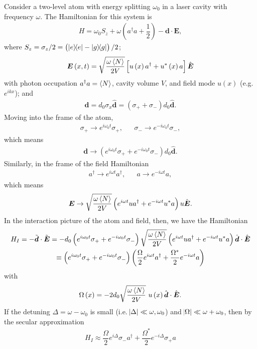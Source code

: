 \documentclass[aps,notitlepage,nofootinbib,10pt]{revtex4-1}
\newcommand{\f}[2]{\dfrac{#1}{#2}} %
\newcommand{\p}[1]{\left(#1\right)} %
\renewcommand{\sp}[1]{\left[#1\right]} %
\renewcommand{\v}{\bm} %
\newcommand{\uv}[1]{\hat{\v{#1}}} %
\renewcommand{\c}{\cdot} %
\newcommand{\bk}{\Braket} %
\newcommand{\1}{\mathds{1}}
\begin{document}
Consider a two-level atom with energy splitting $\omega_0$ in a laser
cavity with frequency $\omega$. The Hamiltonian for this system is
\begin{align}
  H = \omega_0S_z + \omega\p{a^\dag a+\f12} - \v d\c\v E,
\end{align}
where $S_z=\sigma_z/2=\p{\op e - \op g}/2$;
\begin{align}
  \v E\p{x,t}
  = \sqrt{\f{\omega\bk N}{2V}} \sp{u\p{x}a^\dag+u^*\p{x}a} \uv E
\end{align}
with photon occupation $a^\dag a=\bk N$, cavity volume $V$, and field
mode $u\p{x}$ (e.g. $e^{ikx}$); and
\begin{align}
  \v d = d_0\sigma_x\uv d = \p{\sigma_++\sigma_-}d_0\uv d.
\end{align}
Moving into the frame of the atom,
\begin{align}
  \sigma_+ \to e^{i\omega_0t}\sigma_+,
  && \sigma_- \to e^{-i\omega_0t}\sigma_-,
\end{align}
which means
\begin{align}
  \v d \to \p{e^{i\omega_0t}\sigma_++e^{-i\omega_0t}\sigma_-}d_0\uv d.
\end{align}
Similarly, in the frame of the field Hamiltonian
\begin{align}
  a^\dag \to e^{i\omega t}a^\dag, && a \to e^{-i\omega t} a,
\end{align}
which means
\begin{align}
  \v E \to \sqrt{\f{\omega\bk N}{2V}}
  \p{e^{i\omega t} u a^\dag + e^{-i\omega t} u^* a}u\uv E.
\end{align}
In the interaction picture of the atom and field, then, we have the
Hamiltonian
\begin{multline}
  H_I
  = -\tilde{\v d}\c\tilde{\v E}
  = -d_0\p{e^{i\omega_0t}\sigma_++e^{-i\omega_0t}\sigma_-}
  \sqrt{\f{\omega\bk N}{2V}}
  \p{e^{i\omega t} u a^\dag + e^{-i\omega t} u^* a}\uv d\c\uv E \\
  \equiv
  \p{e^{i\omega_0t}\sigma_+ + e^{-i\omega_0t}\sigma_-}
  \p{\f{\Omega}{2}e^{i\omega t}a^\dag + \f{\Omega^*}{2}e^{-i\omega t}a}
\end{multline}
with
\begin{align}
  \Omega\p{x} = -2d_0\sqrt{\f{\omega\bk N}{2V}}~u\p{x}\uv d\c\uv E.
\end{align}
If the detuning $\Delta=\omega-\omega_0$ is small
(i.e. $\abs\Delta\ll\omega,\omega_0$) and
$\abs\Omega\ll\omega+\omega_0$, then by the secular approximation
\begin{align}
  H_I
  \approx \f{\Omega}{2}e^{i\Delta}\sigma_-a^\dag
  + \f{\Omega^*}{2}e^{-i\Delta}\sigma_+a
\end{align}
\end{document}
